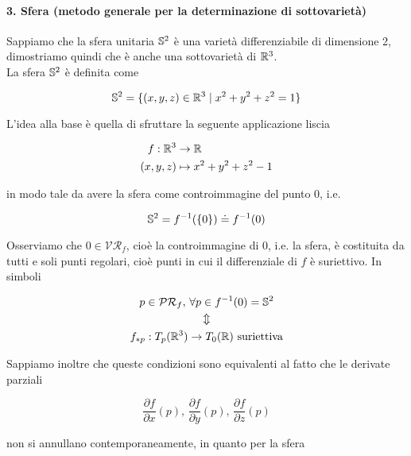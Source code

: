 \paragraph{3. Sfera (metodo generale per la determinazione di sottovarietà)}

Sappiamo che la sfera unitaria $ \S^{2} $ è una varietà differenziabile di dimensione 2, dimostriamo quindi che è anche una sottovarietà di $ \R^{3} $.\\
La sfera $ \S^{2} $ è definita come

\begin{equation}
	\S^{2} = \{ (x,y,z) \in \R^{3} \mid x^{2} + y^{2} + z^{2} = 1 \}
\end{equation}

L'idea alla base è quella di sfruttare la seguente applicazione liscia

\begin{align}
	\begin{split}
		f : \R^{3} &\to \R\\
		(x,y,z) &\mapsto x^{2} + y^{2} + z^{2} - 1
	\end{split}
\end{align}

in modo tale da avere la sfera come controimmagine del punto 0, i.e.

\begin{equation}
\S^{2} = f^{-1}(\{0\}) \doteq f^{-1}(0)
\end{equation}

Osserviamo che $ 0 \in \mathcal{VR}_{f} $, cioè la controimmagine di 0, i.e. la sfera, è costituita da tutti e soli punti regolari, cioè punti in cui il differenziale di $ f $ è suriettivo. In simboli

\begin{gather}
	p \in \mathcal{PR}_{f}, \, \forall p \in f^{-1}(0) = \S^{2}\nonumber\\
	\Updownarrow\\
	f_{*p} : T_{p}(\R^{3}) \to T_{0}(\R) \text{ suriettiva}\nonumber
\end{gather}

Sappiamo inoltre che queste condizioni sono equivalenti al fatto che le derivate parziali

\begin{equation}
	\dfrac{\partial f}{\partial x} (p), \, \dfrac{\partial f}{\partial y} (p), \, \dfrac{\partial f}{\partial z} (p)
\end{equation}

non si annullano contemporaneamente, in quanto per la sfera

